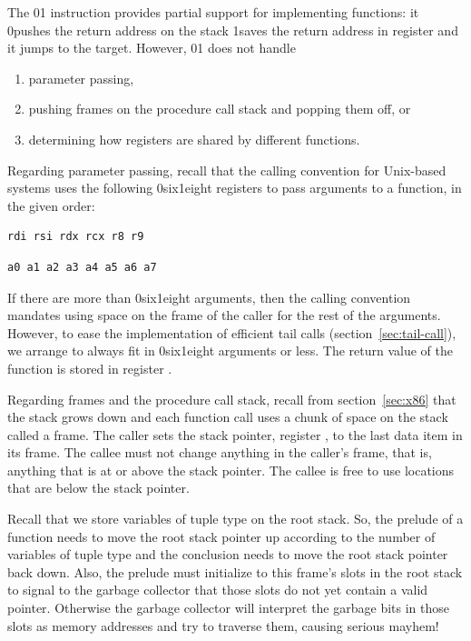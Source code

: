 \documentclass[7x10]{TimesAPriori_MIT}%
\def\xeightysixEd{0}
\def\riscvEd{1}
\def\architecture{1}
\newcommand\ifriscv[1]{\if\architecture\riscvEd{#1}\fi}
\newcommand\ifxeightsix[1]{\if\architecture\xeightysixEd{#1}\fi}
\numberwithin{theorem}{chapter}
\numberwithin{definition}{chapter}
\numberwithin{equation}{chapter}
\begin{document}

The \ifxeightsix{}\ifriscv{} instruction provides partial support for implementing
functions: it 
\ifxeightsix{pushes the return address on the stack}
\ifriscv{saves the return address in register }
and it jumps to
the target. However, \ifxeightsix{}\ifriscv{} does not handle
\begin{enumerate}
\item parameter passing,
\item pushing frames on the procedure call stack and popping them off,
  or
\item determining how registers are shared by different functions.
\end{enumerate}

Regarding parameter passing, recall that the {\ArchName} calling
convention for Unix-based systems uses the following \ifxeightsix{six}\ifriscv{eight} registers to
pass arguments to a function, in the given order:
\if\xeightysixEd
\begin{lstlisting}
rdi rsi rdx rcx r8 r9
\end{lstlisting}
\fi
\if\riscvEd
\begin{lstlisting}
a0 a1 a2 a3 a4 a5 a6 a7
\end{lstlisting}
\fi
If there are more than \ifxeightsix{six}\ifriscv{eight} arguments, then the calling convention
mandates using space on the frame of the caller for the rest of the
arguments. However, to ease the implementation of efficient tail calls
(section~\ref{sec:tail-call}), we arrange to always fit in \ifxeightsix{six}\ifriscv{eight}
arguments or less.
%
The return value of the function is stored in register \RAX.

Regarding frames  and the procedure call stack,
 recall from
section~\ref{sec:x86} that the stack grows down and each function call
uses a chunk of space on the stack called a frame. The caller sets the
stack pointer, register \SP, to the last data item in its
frame. The callee must not change anything in the caller's frame, that
is, anything that is at or above the stack pointer. The callee is free
to use locations that are below the stack pointer.

Recall that we store variables of tuple type on the root stack.  So,
the prelude of a function needs to move the
root stack pointer \ROOTSP{} up according to the number of variables
of tuple type and the conclusion needs to
move the root stack pointer back down.  Also, the prelude must
initialize to  this frame's slots in the root stack to signal
to the garbage collector that those slots do not yet contain a valid
pointer. Otherwise the garbage collector will interpret the garbage
bits in those slots as memory addresses and try to traverse them,
causing serious mayhem!
\end{document}
